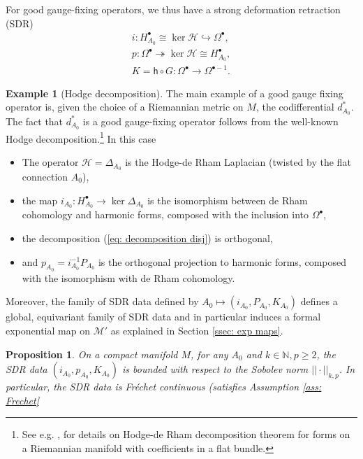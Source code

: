 \documentclass[11pt,a4paper]{amsart}
\theoremstyle{plain} %
\newtheorem{prop}[thm]{Proposition}
\theoremstyle{definition}
\newtheorem{expl}[thm]{Example}
\theoremstyle{remark}
\newcommand{\N}{\mathbb{N}}
\newcommand{\bt}{\bullet}
\newcommand{\sh}{\mathsf{h}}
\newcommand{\M}{\mathcal{M}}
\newcommand{\HHH}{\mathcal{H}}
\begin{document}
{For good gauge-fixing operators, we thus have a strong deformation retraction (SDR)
\begin{equation}\label{eq: SDR good gf}
\begin{gathered}
    i\colon H^\bullet_{A_0}\cong \ker \HHH \hookrightarrow \Omega^\bt, \\
    p\colon \Omega^\bt \twoheadrightarrow \ker \HHH \cong H^\bullet_{A_0}, \\ 
    K= \sh \circ G \colon \Omega^\bullet \to \Omega^{\bullet - 1}.
\end{gathered}
\end{equation}
\begin{expl}[Hodge decomposition] \label{ex: hodge decomposition}
The main example of a good gauge fixing operator is, given the choice of a Riemannian metric on $M$, the codifferential $d^*_{A_0}$. The fact that $d^*_{A_0}$ is a good gauge-fixing operator follows from the well-known Hodge decomposition.\footnote{ 
See e.g. \cite[Section 3]{Ray1971}, \cite{Mathai2011} for details on Hodge-de Rham decomposition theorem for forms on a Riemannian manifold with coefficients in a flat bundle.
}
In this case \begin{itemize}
\item The operator $\HHH = \Delta_{A_0}$ is the Hodge-de Rham Laplacian (twisted by the flat connection $A_0$),
\item the map $i_{A_0} \colon H^\bullet_{A_0} \to \ker \Delta_{A_0}$ is the isomorphism between de Rham cohomology and harmonic forms, composed with the inclusion into $\Omega^\bullet$,
    \item  the decomposition (\ref{eq: decomposition disj}) is orthogonal,
     \item and $p_{A_0} = i_{A_0}^{-1} P_{A_0}$ is the orthogonal projection to harmonic forms, composed with the isomorphism with de Rham cohomology. 
\end{itemize}
Moreover, the family of SDR data defined by $A_0 \mapsto (i_{A_0},P_{A_0},K_{A_0})$ defines a global, equivariant family of SDR data and in particular induces a formal exponential map on $\M'$ as explained in Section \ref{ssec: exp maps}.
\begin{prop}\label{prop: bounded}
    On a compact manifold $M$, for any $A_0$ and $k \in \N, p \geq 2$, the SDR data $(i_{A_0},p_{A_0},K_{A_0})$ is bounded with respect to the Sobolev norm $||\cdot||_{k,p}$. In particular, the SDR data is Fr\'echet continuous (satisfies Assumption \ref{ass: Frechet}%

\end{prop}
\end{expl}}
\end{document}
